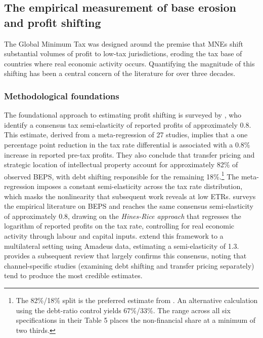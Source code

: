 \documentclass[11pt,a4paper]{article}
\begin{document}
\subsection{The empirical measurement of base erosion and profit shifting}\label{sec:beps}

The Global Minimum Tax was designed around the premise that MNEs shift substantial volumes of profit to low-tax jurisdictions, eroding the tax base of countries where real economic activity occurs. Quantifying the magnitude of this shifting has been a central concern of the literature for over three decades.

\subsubsection{Methodological foundations}

The foundational approach to estimating profit shifting is surveyed by \citet{heckemeyer2017}, who identify a consensus tax semi-elasticity of reported profits of approximately 0.8. This estimate, derived from a meta-regression of 27 studies, implies that a one percentage point reduction in the tax rate differential is associated with a 0.8\% increase in reported pre-tax profits. They also conclude that transfer pricing and strategic location of intellectual property account for approximately 82\% of observed BEPS, with debt shifting responsible for the remaining 18\%.\footnote{The 82\%/18\% split is the preferred estimate from \citet{heckemeyer2017}. An alternative calculation using the debt-ratio control yields 67\%/33\%. The range across all six specifications in their Table 5 places the non-financial share at a minimum of two thirds.} The meta-regression imposes a constant semi-elasticity across the tax rate distribution, which masks the nonlinearity that subsequent work reveals at low ETRs. \citet{dharmapala2014} surveys the empirical literature on BEPS and reaches the same consensus semi-elasticity of approximately 0.8, drawing on the \emph{Hines-Rice approach} that regresses the logarithm of reported profits on the tax rate, controlling for real economic activity through labour and capital inputs. \citet{huizinga2008} extend this framework to a multilateral setting using Amadeus data, estimating a semi-elasticity of 1.3. \citet{riedel2018} provides a subsequent review that largely confirms this consensus, noting that channel-specific studies (examining debt shifting and transfer pricing separately) tend to produce the most credible estimates.
\end{document}
